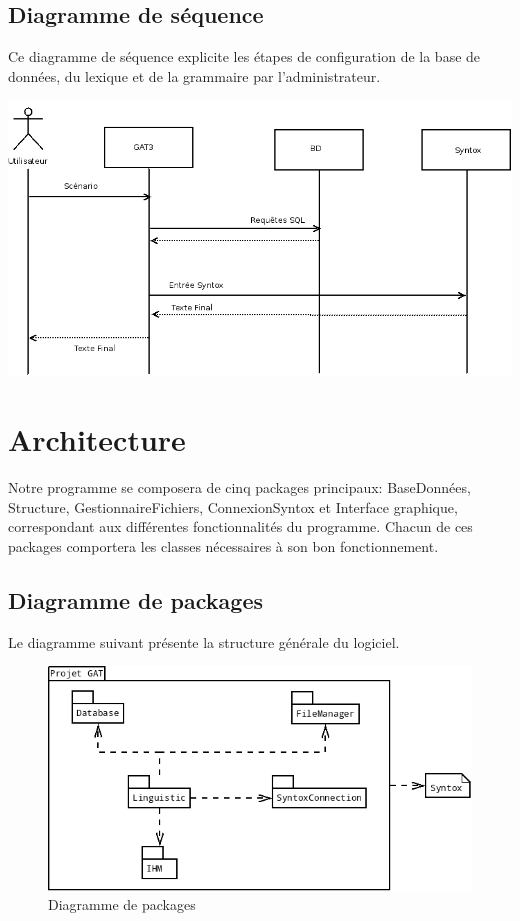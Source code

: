 \documentclass[12pt]{report}
\begin{document}
\subsection{Diagramme de séquence}

	Ce diagramme de séquence explicite les étapes de configuration de la base de données, du lexique et de la grammaire par l'administrateur. 

	\includegraphics[scale=0.4]{diasequence2.png}


\section{Architecture}
Notre programme se composera de cinq packages principaux: BaseDonnées, Structure, GestionnaireFichiers, ConnexionSyntox et Interface graphique, correspondant aux différentes fonctionnalités du programme.
Chacun de ces packages comportera les classes nécessaires à son bon fonctionnement.

\subsection{Diagramme de packages}
Le diagramme suivant présente la structure générale du logiciel.

\begin{figure}[!h]
\begin{center}
\includegraphics[scale=0.45]{DiagPackages.png}
\caption{Diagramme de packages}
\end{center}
\end{figure}
\end{document}
